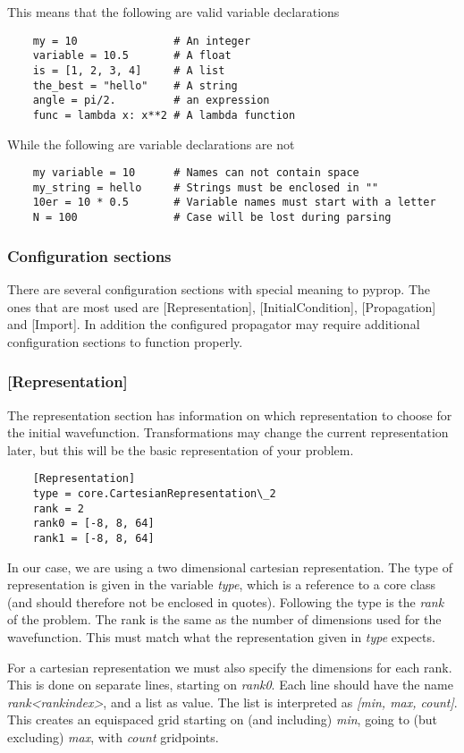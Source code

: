 \documentclass[a4paper,12pt]{report}
\begin{document}
\noindent This means that the following are valid variable declarations
\begin{verbatim}
	my = 10               # An integer
	variable = 10.5       # A float
	is = [1, 2, 3, 4]     # A list
	the_best = "hello"    # A string
	angle = pi/2.         # an expression
	func = lambda x: x**2 # A lambda function
\end{verbatim}
While the following are variable declarations are not
\begin{verbatim}
	my variable = 10      # Names can not contain space
	my_string = hello     # Strings must be enclosed in ""
	10er = 10 * 0.5       # Variable names must start with a letter
	N = 100               # Case will be lost during parsing
\end{verbatim}

\subsubsection*{Configuration sections}
There are several configuration sections with special meaning to pyprop. The ones that are most used are [Representation], 
[InitialCondition], [Propagation] and [Import]. In addition the configured propagator may require additional 
configuration sections to function properly.

\subsubsection*{[Representation]}
The representation section has information on which representation to choose for the initial wavefunction. Transformations
may change the current representation later, but this will be the basic representation of your problem. 
\begin{verbatim}
	[Representation]
	type = core.CartesianRepresentation\_2
	rank = 2
	rank0 = [-8, 8, 64]
	rank1 = [-8, 8, 64]
\end{verbatim}
In our case, we are
using a two dimensional cartesian representation. The type of representation is given in the variable \textit{type}, which
is a reference to a core class (and should therefore not be enclosed in quotes). Following the type is the \textit{rank} 
of the problem. The rank is the same as the number of dimensions used for the wavefunction. 
This must match what the representation given in \textit{type} expects.

For a cartesian representation we must also specify the dimensions for each rank. This is done on separate lines, 
starting on \textit{rank0}. Each line should have the name \textit{rank<rankindex>}, and a list as value. The list is
interpreted as \textit{[min, max, count]}. This creates an equispaced grid starting on (and including) \textit{min},
going to (but excluding) \textit{max}, with \textit{count} gridpoints.
\end{document}
